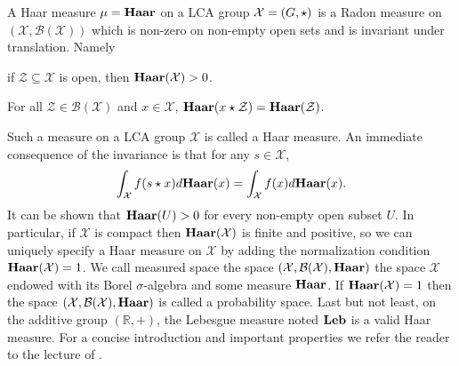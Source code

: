 \begin{definition}
    A Haar measure $\mu=\mathbf{Haar}$ on a \ac{LCA} group $\mathcal{X}=(G,\star)$
    is a Radon measure on $(\mathcal{X},\mathcal{B}(\mathcal{X}))$ which is
    non-zero on non-empty open sets and is invariant under translation. Namely
    \begin{propenum}
        \item if $\mathcal{Z} \subseteq \mathcal{X}$ is open, then
        $\mathbf{Haar}(\mathcal{X})>0$.
        \item For all $\mathcal{Z}\in\mathcal{B}(\mathcal{X})$ and $x \in
        \mathcal{X}$, $\mathbf{Haar}(x\star \mathcal{Z})=\mathbf{Haar}(\mathcal{Z})$.
    \end{propenum}
\end{definition}
Such a measure on a \ac{LCA} group $\mathcal{X}$ is called a Haar
measure. An immediate
consequence of the invariance is that for any $s\in\mathcal{X}$,
\begin{dmath*}
    \int_{\mathcal{X}}f(s\groupop x)d\Haar(x)=\int_{\mathcal{X}}f(x)d\Haar(x).
\end{dmath*}
It can be shown that $\mathbf{Haar}(U) > 0$ for every non-empty open subset $U$. In
particular, if $\mathcal{X}$ is compact then $\mathbf{Haar}(\mathcal{X})$ is finite and
positive, so we can uniquely specify a Haar measure on $\mathcal{X}$ by adding
the normalization condition $\mathbf{Haar}(\mathcal{X})=1$. We call measured space the
space $(\mathcal{X},\mathcal{B}(\mathcal{X}),\mathbf{Haar})$ the space $\mathcal{X}$
endowed with its Borel $\sigma$-algebra and some measure $\mathbf{Haar}$. If
$\mathbf{Haar}(\mathcal{X})=1$ then the space
$(\mathcal{X},\mathcal{B}(\mathcal{X}),\mathbf{Haar})$ is called a probability space.
Last but not least, on the additive group $(\mathbb{R},+)$, the Lebesgue
measure noted $\mathbf{Leb}$ is a valid Haar measure. For a concise introduction and
important properties we refer the reader to the lecture of
\citet{tornier2014haar}.

